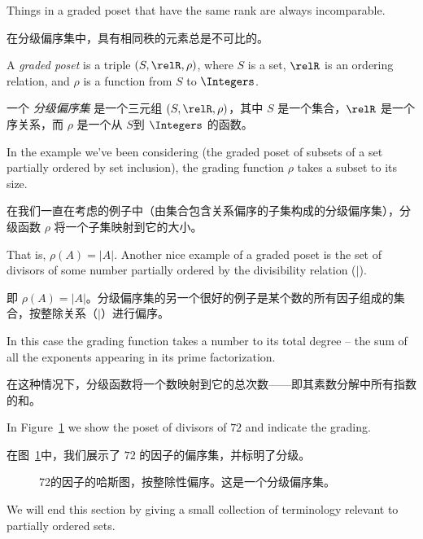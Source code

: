 Things
in a graded poset that have the same rank are always incomparable.

在分级偏序集中，具有相同秩的元素总是不可比的。

\begin{defi}
A \emph{graded poset} is a triple $(S, \relR, \rho)$, where $S$ is a set,
$\relR$ is an ordering relation, and $\rho$ is a function from $S$ to $\Integers$.
\end{defi}

\begin{defi}
一个 \emph{分级偏序集} 是一个三元组 $(S, \relR, \rho)$，其中 $S$ 是一个集合，$\relR$ 是一个序关系，而 $\rho$ 是一个从 $S$到 $\Integers$ 的函数。
\end{defi}

In the example we've been considering (the graded poset of subsets of a set
partially ordered by set inclusion), the grading function $\rho$ takes a
subset to its size.

在我们一直在考虑的例子中（由集合包含关系偏序的子集构成的分级偏序集），分级函数 $\rho$ 将一个子集映射到它的大小。

That is, $\rho(A) = |A|$.  Another nice example of
a graded poset is the set of divisors of some number partially ordered
by the divisibility relation ($\mid$).

即 $\rho(A) = |A|$。分级偏序集的另一个很好的例子是某个数的所有因子组成的集合，按整除关系（$\mid$）进行偏序。

In this case the grading function
takes a number to its total degree -- the sum of all the exponents
appearing in its prime factorization.

在这种情况下，分级函数将一个数映射到它的总次数——即其素数分解中所有指数的和。

In Figure~\ref{fig:divisors_of_72}
we show the poset of divisors of $72$ and indicate the grading.

在图~\ref{fig:divisors_of_72}中，我们展示了 $72$ 的因子的偏序集，并标明了分级。

\begin{figure}[!hbtp]

\caption[Hasse diagram of divisors of 72.]{Hasse %
diagram for the divisors of $72$, partially ordered by %
divisibility. This is a graded poset.}
\caption[72的因子的哈斯图。]{72的因子的哈斯图，按整除性偏序。这是一个分级偏序集。}
\label{fig:divisors_of_72} 
\end{figure}

We will end this section by giving a small collection of terminology
relevant to partially ordered sets.

